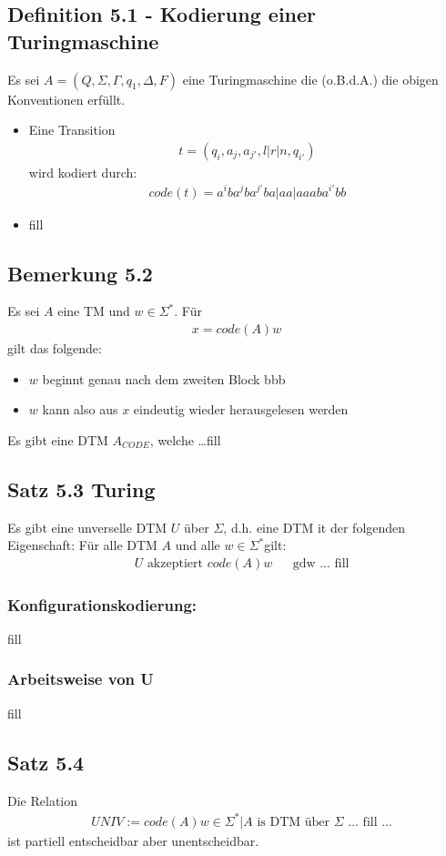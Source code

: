 \subsection{Definition 5.1 - Kodierung einer Turingmaschine}
Es sei $A = (Q, \Sigma, \Gamma, q_1, \Delta, F)$ eine Turingmaschine die (o.B.d.A.) die obigen Konventionen erfüllt.
\begin{itemize}
	\item Eine Transition
	\begin{align*}
		t = (q_i, a_j, a_{j'}, l|r|n, q_{i'})
	\end{align*}
	wird kodiert durch:
	\begin{align*}
		code(t) = a^iba^jba^{j'}ba|aa|aaaba^{i'}bb
	\end{align*}
	\item fill
\end{itemize}
\subsection{Bemerkung 5.2}
Es sei $A$ eine TM und $w\in \Sigma^*$. Für
\begin{align*}
	x = code(A)w
\end{align*}
gilt das folgende:
\begin{itemize}
	\item $w$ beginnt genau nach dem zweiten Block bbb
	\item $w$ kann also aus $x$ eindeutig wieder herausgelesen werden
\end{itemize}
Es gibt eine DTM $A_{CODE}$, welche \ldots fill
\subsection{Satz 5.3 Turing}
Es gibt eine unverselle DTM $U$ über $\Sigma$, d.h. eine DTM it der folgenden Eigenschaft: Für alle DTM $A$ und alle $w \in \Sigma^*$gilt:
\begin{align*}
	&U\text{ akzeptiert } code(A)w &&\text{gdw ... fill}
\end{align*}
\subsubsection{Konfigurationskodierung:}
fill
\subsubsection{Arbeitsweise von U}
fill
\subsection{Satz 5.4}
Die Relation
\begin{align*}
	&UNIV := code(A)w \in \Sigma^* | A \text{ is DTM über }\Sigma \text{ ... fill ...}
\end{align*}
ist partiell entscheidbar aber unentscheidbar.
